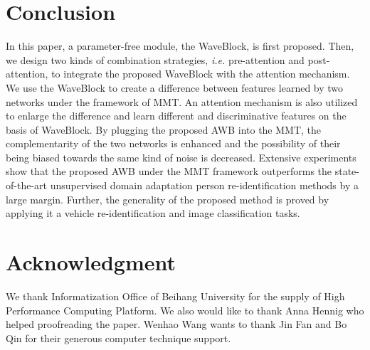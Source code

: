 \documentclass[journal]{IEEEtran}
\begin{document}
\section{Conclusion}
In this paper, a parameter-free module, the WaveBlock, is first proposed. Then, we design two kinds of combination strategies, \textit{i.e.} pre-attention and post-attention, to integrate the proposed WaveBlock with the attention mechanism. We use the WaveBlock to create a difference between features learned by two networks under the framework of MMT. An attention mechanism is also utilized to enlarge the difference and learn different and discriminative features on the basis of WaveBlock. By plugging the proposed AWB into the MMT, the complementarity of the two networks is enhanced and the possibility of their being biased towards the same kind of noise is decreased. Extensive experiments show that the proposed AWB under the MMT framework outperforms the state-of-the-art unsupervised domain adaptation person re-identification methods by a large margin. Further, the generality of the proposed method is proved by applying it a vehicle re-identification and image classification tasks.










































\section*{Acknowledgment}
We thank Informatization Office of Beihang University for the supply of High Performance Computing Platform. We also would like to thank Anna Hennig who helped proofreading the paper. Wenhao Wang wants to thank Jin Fan and Bo Qin for their generous computer technique support. 
\end{document}
